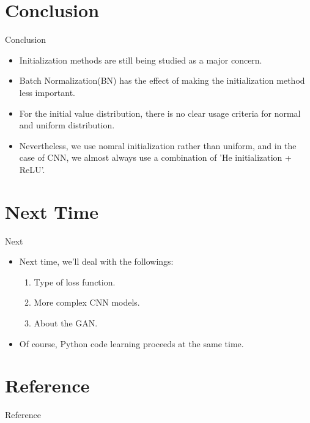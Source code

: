 \documentclass{beamer}
\begin{document}
	\section{Conclusion}
	\begin{frame}{Conclusion}
		\begin{itemize}
			\item Initialization methods are still being studied as a major concern.
			\item Batch Normalization(BN) has the effect of making the initialization method less important.
			\item For the initial value distribution, there is no clear usage criteria for normal and uniform distribution.
			\item Nevertheless, we use nomral initialization rather than uniform, and in the case of CNN, we almost always use a combination of 'He initialization + ReLU'.
		\end{itemize}
	\end{frame}


	\section{Next Time}
	\begin{frame}{Next}
		\begin{itemize}
			\item Next time, we'll deal with the followings:
			\vspace{7pt}
			\begin{enumerate}
				\item Type of loss function.
				\item More complex CNN models.
				\item About the GAN.
			\end{enumerate}
			\vspace{7pt}
			\item Of course, Python code learning proceeds at the same time.
		\end{itemize}
	\end{frame}
	
	
	\section{Reference}
	\begin{frame}[allowframebreaks]{Reference}
		
	\end{frame}
\end{document}
